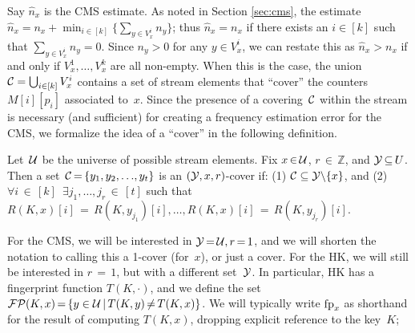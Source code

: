 Say $\hat{n}_x$ is the CMS estimate.
As noted in Section \ref{sec:cms}, the estimate $\hat{n}_x = n_x + \min_{i \in [k]}\{\sum_{y \in V^i_x }n_y\}$; thus $\hat{n}_x = n_x$ if there exists an $i\in[k]$ such that $\sum_{y \in V^i_x }n_y=0$.  Since $n_y > 0$ for any $y \in V^{i}_x$, we
can restate this as $\hat{n}_x > n_x$ if and only if $V^{1}_x,\ldots,V^{k}_x$ are all non-empty.  When this is the case, 
the union $\mathcal{C} = \bigcup_{i\in[k]} V^{i}_x$ contains a set of stream elements that ``cover'' the counters $M[i][p_i]$ associated to~$x$. 
Since the presence of a covering~$\mathcal{C}$ within the stream is necessary (and sufficient)
for creating a frequency estimation error for the CMS, we formalize the idea of a ``cover'' in the following definition.

\begin{definition} Let~$\mathcal{U}$ be the universe of possible stream elements.  Fix $x \,{\in}\, \mathcal{U}$, $r\,{\in}\,\mathbb{Z}$, and $\mathcal{Y}\,{\subseteq}\,U$. Then a set~$\mathcal{C}\,{=}\,\{y_1,y_2,{\dots},y_t\}$ is an $(\mathcal{Y},x,r)$-cover if: (1) $\mathcal{C}\subseteq \mathcal{Y}{\setminus}\{x\}$, and (2)$\forall i \,{\in}\, [k]\,$ $\exists j_1,\ldots,j_r\,{\in}\,[t]$ such that $R(K,x)[i]\,{=}\,R(K,y_{j_1})[i],{\ldots},R(K,x)[i]\,{=}\,R(K,y_{j_r})[i]$.
	\myenddef
\end{definition}

For the CMS, we will be interested in $\mathcal{Y}\,{=}\,\mathcal{U}, r\,{=}\,1$, and we will shorten the notation to calling this a 1-cover (for~$x$), or just a cover. 
For the HK, we will still be interested in $r\,{=}\,1$, but with a different set~$\mathcal{Y}$.   In particular, HK has a fingerprint function $T(K,\cdot)$, and we define the set $\mathcal{FP}(K,x)\,{=}\,\{y \in \mathcal{U} \,|\, T(K,y) \,{\not=}\, T(K,x)\}$. We will typically write $\textup{fp}_x$ as shorthand for the result of computing $T(K,x)$, dropping explicit reference to the key~$K$;   

